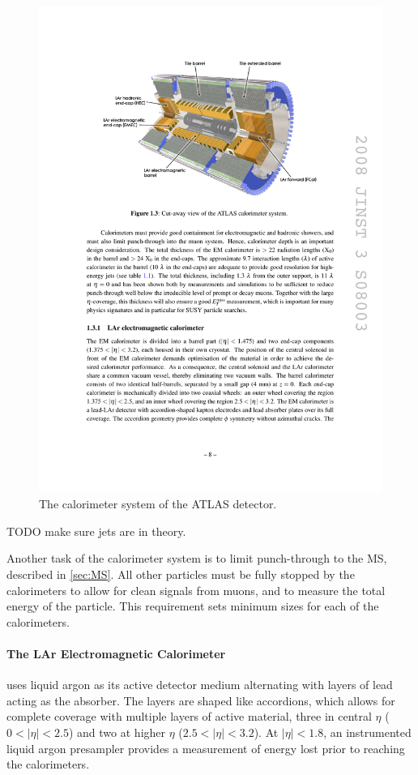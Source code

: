 \begin{centering}
\begin{figure}[bth]
\myfloatalign
\includegraphics[width=.90\linewidth]{figures/atlas/calorimeters.pdf}
\caption{The calorimeter system of the ATLAS detector.}
\label{fig:calo}
\end{figure}
\end{centering}

TODO make sure jets are in theory.

Another task of the calorimeter system is to limit punch-through to the \ac{MS}, described in \autoref{sec:MS}. All other particles must be fully stopped by the calorimeters to allow for clean signals from muons, and to measure the total energy of the particle. This requirement sets minimum sizes for each of the calorimeters. 

\paragraph{The LAr Electromagnetic Calorimeter} uses liquid argon as its active detector medium alternating with layers of lead acting as the absorber. The layers are shaped like accordions, which allows for complete coverage with multiple layers of active material, three in central $\eta$ ($0<|\eta|<2.5$) and two at higher $\eta$ ($2.5 < |\eta| < 3.2$). At $|\eta| < 1.8$, an instrumented liquid argon presampler provides a measurement of energy lost prior to reaching the calorimeters.

